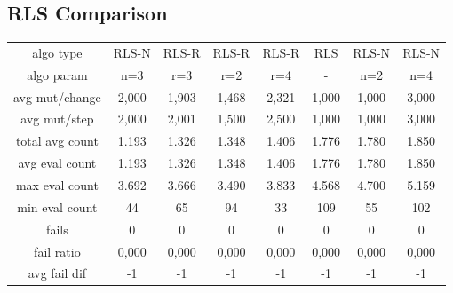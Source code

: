 \subsection{RLS Comparison}
\begin{tabular}[h]{cccccccc}
algo type&            RLS-N&     RLS-R&     RLS-R&     RLS-R&       RLS&     RLS-N&     RLS-N\\
algo param&             n=3&       r=3&       r=2&       r=4&         -&       n=2&       n=4\\
avg mut/change&       2,000&     1,903&     1,468&     2,321&     1,000&     1,000&     3,000\\
avg mut/step&         2,000&     2,001&     1,500&     2,500&     1,000&     1,000&     3,000\\
\hline
total avg count&      1.193&     1.326&     1.348&     1.406&     1.776&     1.780&     1.850\\
avg eval count&       1.193&     1.326&     1.348&     1.406&     1.776&     1.780&     1.850\\
max eval count&       3.692&     3.666&     3.490&     3.833&     4.568&     4.700&     5.159\\
min eval count&          44&        65&        94&        33&       109&        55&       102\\
\hline
fails&                    0&         0&         0&         0&         0&         0&         0\\
fail ratio&           0,000&     0,000&     0,000&     0,000&     0,000&     0,000&     0,000\\
avg fail dif&            -1&        -1&        -1&        -1&        -1&        -1&        -1\\
\end{tabular}
